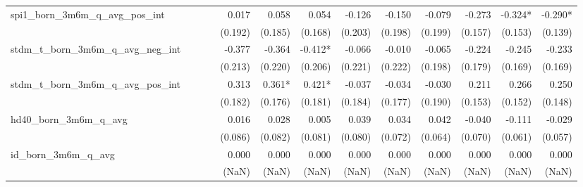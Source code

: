 \begin{tabular}{lrrrrrrrrrrrr}
spi1\_born\_3m6m\_q\_avg\_pos\_int          &              &              &              &        0.017 &        0.058 &        0.054 &       -0.126 &       -0.150 &       -0.079 &       -0.273 &      -0.324* &      -0.290* \\ 
                                            &              &              &              &      (0.192) &      (0.185) &      (0.168) &      (0.203) &      (0.198) &      (0.199) &      (0.157) &      (0.153) &      (0.139) \\ 
stdm\_t\_born\_3m6m\_q\_avg\_neg\_int       &              &              &              &       -0.377 &       -0.364 &      -0.412* &       -0.066 &       -0.010 &       -0.065 &       -0.224 &       -0.245 &       -0.233 \\ 
                                            &              &              &              &      (0.213) &      (0.220) &      (0.206) &      (0.221) &      (0.222) &      (0.198) &      (0.179) &      (0.169) &      (0.169) \\ 
stdm\_t\_born\_3m6m\_q\_avg\_pos\_int       &              &              &              &        0.313 &       0.361* &       0.421* &       -0.037 &       -0.034 &       -0.030 &        0.211 &        0.266 &        0.250 \\ 
                                            &              &              &              &      (0.182) &      (0.176) &      (0.181) &      (0.184) &      (0.177) &      (0.190) &      (0.153) &      (0.152) &      (0.148) \\ 
hd40\_born\_3m6m\_q\_avg                    &              &              &              &        0.016 &        0.028 &        0.005 &        0.039 &        0.034 &        0.042 &       -0.040 &       -0.111 &       -0.029 \\ 
                                            &              &              &              &      (0.086) &      (0.082) &      (0.081) &      (0.080) &      (0.072) &      (0.064) &      (0.070) &      (0.061) &      (0.057) \\ 
id\_born\_3m6m\_q\_avg                      &              &              &              &        0.000 &        0.000 &        0.000 &        0.000 &        0.000 &        0.000 &        0.000 &        0.000 &        0.000 \\ 
                                            &              &              &              &        (NaN) &        (NaN) &        (NaN) &        (NaN) &        (NaN) &        (NaN) &        (NaN) &        (NaN) &        (NaN) \\ 

\end{tabular}
